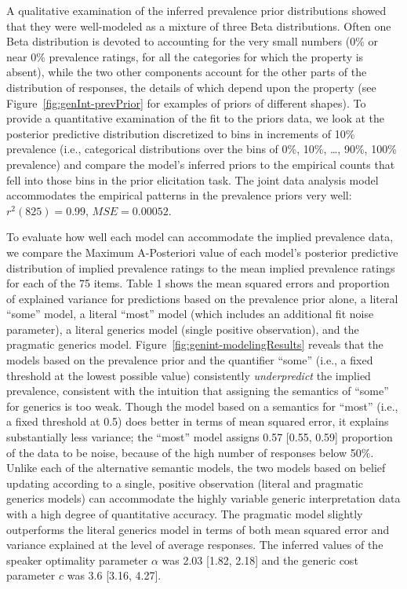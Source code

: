 \documentclass[floatsintext,doc]{apa6}
\begin{document}
A qualitative examination of the inferred prevalence prior distributions showed that they were well-modeled as a mixture of three Beta distributions.
Often one Beta distribution is devoted to accounting for the very small numbers (0\% or near 0\% prevalence ratings, for all the categories for which the property is absent), while the two other components account for the other parts of the distribution of responses, the details of which depend upon the property (see Figure~\ref{fig:genInt-prevPrior} for examples of priors of different shapes).
To provide a quantitative examination of the fit to the priors data, we look at the posterior predictive distribution discretized to bins in increments of 10\% prevalence (i.e., categorical distributions over the bins of 0\%, 10\%, \ldots{}, 90\%, 100\% prevalence) and compare the model's inferred priors to the empirical counts that fell into those bins in the prior elicitation task.
The joint data analysis model accommodates the empirical patterns in the prevalence priors very well: \(r^2(825) = 0.99\), \(MSE = 0.00052\).

To evaluate how well each model can accommodate the implied prevalence data, we compare the Maximum A-Posteriori value of each model's posterior predictive distribution of implied prevalence ratings to the mean implied prevalence ratings for each of the 75 items.
Table 1 shows the mean squared errors and proportion of explained variance for predictions based on the prevalence prior alone, a literal \enquote{some} model, a literal \enquote{most} model (which includes an additional fit noise parameter), a literal generics model (single positive observation), and the pragmatic generics model.
Figure~\ref{fig:genint-modelingResults} reveals that the models based on the prevalence prior and the quantifier \enquote{some} (i.e., a fixed threshold at the lowest possible value) consistently \emph{underpredict} the implied prevalence, consistent with the intuition that assigning the semantics of \enquote{some} for generics is too weak.
Though the model based on a semantics for \enquote{most} (i.e., a fixed threshold at 0.5) does better in terms of mean squared error, it explains substantially less variance; the \enquote{most} model assigns 0.57 {[}0.55, 0.59{]} proportion of the data to be noise, because of the high number of responses below 50\%.
Unlike each of the alternative semantic models, the two models based on belief updating according to a single, positive observation (literal and pragmatic generics models) can accommodate the highly variable generic interpretation data with a high degree of quantitative accuracy.
The pragmatic model slightly outperforms the literal generics model in terms of both mean squared error and variance explained at the level of average responses.
The inferred values of the speaker optimality parameter \(\alpha\) was 2.03 {[}1.82, 2.18{]} and the generic cost parameter \(c\) was 3.6 {[}3.16, 4.27{]}.
\end{document}
